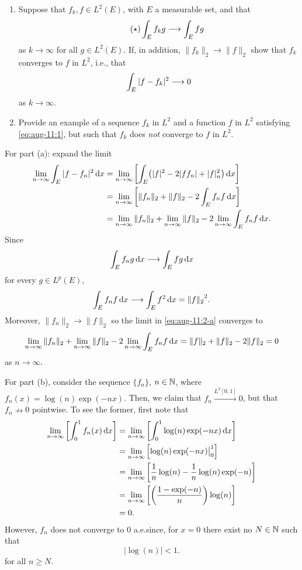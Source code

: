 \begin{problem}
  \hfill
  \begin{enumerate}[label=(\alph*)]
  \item Suppose that \(f_k,f\in L^2(E)\), with \(E\) a measurable set, and
    that
    \[
      \label{eq:aug-11:1}
      \tag{\(\bigstar\)}
      \int_E f_kg\too\int_E fg
    \]
    as \(k\to\infty\) for all \(g\in L^2(E)\). If, in addition,
    \(\|f_k\|_2\to\|f\|_2\) show that \(f_k\) converges to \(f\) in
    \(L^2\), i.e., that
    \[
      \int_E|f-f_k|^2\longrightarrow 0
    \]
    as \(k\to\infty\).
  \item Provide an example of a sequence \(f_k\) in \(L^2\) and a function
    \(f\) in \(L^2\) satisfying \eqref{eq:aug-11:1}, but such that \(f_k\)
    does \emph{not} converge to \(f\) in \(L^2\).
  \end{enumerate}
\end{problem}
\begin{solution}
  For part (a): expand the limit
  \begin{gather}
    \label{eq:aug-11:2-a}
    \begin{aligned}
      \lim_{n\to\infty}\int_E|f-f_n|^2\mathop{}\!\mathrm{d} x
      &=\lim_{n\to\infty}\left[\int_E\bigl(|f|^2-2|ff_n|+|f|_n^2\bigr)\mathop{}\!\mathrm{d} x\right]\\
      &=\lim_{n\to\infty}\left[\|f_n\|_2+\|f\|_2-2\int_E f_nf\mathop{}\!\mathrm{d} x\right]\\
      &=\lim_{n\to\infty}\|f_n\|_2+\lim_{n\to\infty}\|f\|_2-2\lim_{n\to\infty}\int_E
      f_nf\mathop{}\!\mathrm{d} x.
    \end{aligned}
  \end{gather}
  Since
  \[
    \int_Ef_ng\mathop{}\!\mathrm{d} x\longrightarrow \int_E fg\mathop{}\!\mathrm{d} x
  \]
  for every \(g\in L^p(E)\),
  \[
    \int_E f_nf\diff x\too \int_Ef^2\diff x={\|f\|_2}^{\cramped 2}.
  \]
  Moreover, \(\|f_n\|_2\to\|f\|_2\) so the limit in \eqref{eq:aug-11:2-a}
  converges to
  \[
    \lim_{n\to\infty}\|f_n\|_2+\lim_{n\to\infty}\|f\|_2-2\lim_{n\to\infty}\int_E
    f_nf\diff x
    =%
    \|f\|_2+\|f\|_2-2\|f\|_2=0
  \]
  as \(n\to\infty\).

  For part (b), consider the sequence \(\{f_n\}\), \(n\in\mathbb{N}\), where
  \(f_n(x)=\log(n)\exp(-nx)\). Then, we claim that
  \(f_n\xrightarrow{L^2[0,1]}0\), but that \(f_n\nrightarrow 0\)
  pointwise. To see the former, first note that
  \[
    \begin{aligned}
      \lim_{n\to\infty}\left[\int_0^1 f_n(x)\diff x\right]
      &=\lim_{n\to\infty}\left[\int_0^1\log(n)\exp(-nx)\diff x\right]\\
      &=\lim_{n\to\infty}\left[\log(n)\exp(-nx)\bigr|_0^1\right]\\
      &=\lim_{n\to\infty}\left[
      \frac{1}{n}\log(n)-\frac{1}{n}\log(n)\exp(-n)
      \right]\\
      &=\lim_{n\to\infty}\left[%
        \left(\frac{1-\exp(-n)}{n}\right)\log(n)%
      \right]\\
      &=0.
    \end{aligned}
  \]
  However, \(f_n\) does not converge to \(0\) a.e.\@ since, for
  \(x=0\) there exist no \(N\in\mathbb{N}\) such that
  \[
    |\log(n)|<1.
  \]
  for all \(n\geq N\).
\end{solution}


